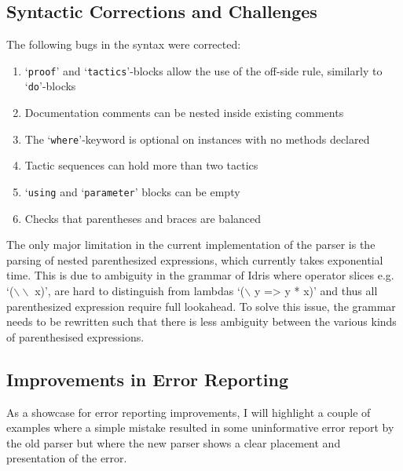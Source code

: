 \documentclass[a4paper]{article}%
\begin{document}
\subsection{Syntactic Corrections and Challenges}
\label{sub:SyntacticCorrectionsandChallenges}
The following bugs in the syntax were corrected:
\begin{enumerate}
  \item `\texttt{proof}' and `\texttt{tactics}'-blocks allow the use of the off-side rule, similarly to `\texttt{do}'-blocks
  \item Documentation comments can be nested inside existing comments
  \item The `\texttt{where}'-keyword is optional on instances with no methods declared
  \item Tactic sequences can hold more than two tactics
  \item `\texttt{using} and `\texttt{parameter}' blocks can be empty
  \item Checks that parentheses and braces are balanced
\end{enumerate}

The only major limitation in the current implementation of the parser is the parsing of nested parenthesized expressions, which currently takes exponential time.
This is due to ambiguity in the grammar of Idris where operator slices e.g. `($\backslash\backslash$ x)', are hard to distinguish from lambdas `($\backslash$ y => y * x)' and thus all parenthesized expression require full lookahead.
To solve this issue, the grammar needs to be rewritten such that there is less ambiguity between the various kinds of parenthesised expressions.

\subsection{Improvements in Error Reporting}
\label{sub:ErrorReportImprovements}
As a showcase for error reporting improvements, I will highlight a couple of examples where a simple mistake resulted in some uninformative error report by the old parser
but where the new parser shows a clear placement and presentation of the error.
\end{document}
